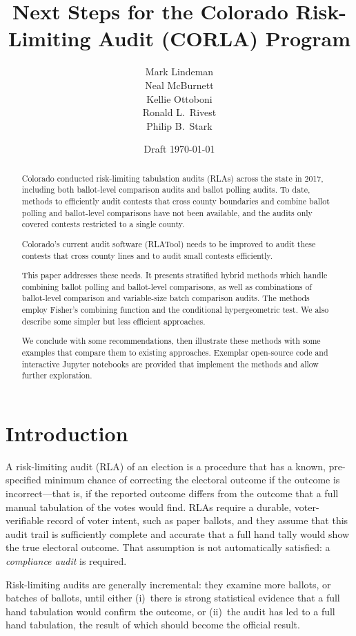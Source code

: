 \documentclass[12pt]{article}
\title{Next Steps for the Colorado Risk-Limiting Audit (CORLA) Program}
\author{
   Mark Lindeman\\
   Neal McBurnett\\
   Kellie Ottoboni\\
   Ronald L.~Rivest\\
   Philip B.~Stark
}
\date{Draft \today}
\begin{document}
\maketitle


\begin{abstract}
Colorado conducted risk-limiting tabulation audits (RLAs) across the state in 2017,
including both ballot-level comparison audits and ballot polling audits.
To date, methods to efficiently audit contests that cross county boundaries
and combine ballot polling and ballot-level comparisons have not been available,
and the audits only covered contests restricted to a single county.

Colorado's current audit software (RLATool) needs to be improved to audit
these contests that cross county lines and to audit small contests efficiently.

This paper addresses these needs. It presents stratified hybrid methods
which handle combining ballot polling and ballot-level comparisons,
as well as combinations of ballot-level comparison and
variable-size batch comparison audits.
The methods employ Fisher’s combining function and the conditional hypergeometric test.
We also describe some simpler but less efficient approaches.

We conclude with some recommendations, then illustrate these methods
with some examples that compare them to existing approaches.
Exemplar open-source code and interactive Jupyter notebooks are provided
that implement the methods and allow further exploration.
\end{abstract}

\section{Introduction}
A risk-limiting audit (RLA) of an election is a procedure that
has a known, pre-specified minimum chance of correcting the electoral outcome if the outcome
is incorrect---that is, if the reported outcome differs from the outcome that a full manual
tabulation of the votes would find. 
RLAs require a durable, voter-verifiable record of voter intent, such as paper ballots,
and they assume that this audit trail is sufficiently complete and accurate that a full hand
tally would show the true electoral outcome.
That assumption is not automatically satisfied: a \emph{compliance audit}
\citep{starkWagner12} 
is required.

Risk-limiting audits are generally incremental: they examine more ballots, or batches of ballots,
until either (i)~there is strong statistical evidence that a full hand tabulation would confirm the outcome,
or (ii)~the audit has led to a full hand tabulation, the result of which should become the official
result.
\end{document}
